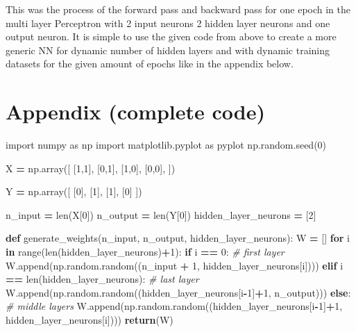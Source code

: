 \documentclass[
]{book}
\newenvironment{Shaded}{\begin{snugshade}}{\end{snugshade}}
\newcommand{\BuiltInTok}[1]{#1}
\newcommand{\CommentTok}[1]{\textcolor[rgb]{0.56,0.35,0.01}{\textit{#1}}}
\newcommand{\ControlFlowTok}[1]{\textcolor[rgb]{0.13,0.29,0.53}{\textbf{#1}}}
\newcommand{\DecValTok}[1]{\textcolor[rgb]{0.00,0.00,0.81}{#1}}
\newcommand{\ImportTok}[1]{#1}
\newcommand{\KeywordTok}[1]{\textcolor[rgb]{0.13,0.29,0.53}{\textbf{#1}}}
\newcommand{\NormalTok}[1]{#1}
\newcommand{\OperatorTok}[1]{\textcolor[rgb]{0.81,0.36,0.00}{\textbf{#1}}}
\begin{document}
This was the process of the forward pass and backward pass for one epoch in the multi layer Perceptron with 2 input neurons 2 hidden layer neurons and one output neuron. It is simple to use the given code from above to create a more generic NN for dynamic number of hidden layers and with dynamic training datasets for the given amount of epochs like in the appendix below.

\hypertarget{appendix-complete-code-2}{%
\section{Appendix (complete code)}\label{appendix-complete-code-2}}

\begin{Shaded}
\begin{Highlighting}[]
\ImportTok{import}\NormalTok{ numpy }\ImportTok{as}\NormalTok{ np}
\ImportTok{import}\NormalTok{ matplotlib.pyplot }\ImportTok{as}\NormalTok{ pyplot}
\NormalTok{np.random.seed(}\DecValTok{0}\NormalTok{)}

\NormalTok{X }\OperatorTok{=}\NormalTok{ np.array([}
\NormalTok{  [}\DecValTok{1}\NormalTok{,}\DecValTok{1}\NormalTok{],}
\NormalTok{  [}\DecValTok{0}\NormalTok{,}\DecValTok{1}\NormalTok{],}
\NormalTok{  [}\DecValTok{1}\NormalTok{,}\DecValTok{0}\NormalTok{],}
\NormalTok{  [}\DecValTok{0}\NormalTok{,}\DecValTok{0}\NormalTok{],}
\NormalTok{])}

\NormalTok{Y }\OperatorTok{=}\NormalTok{ np.array([}
\NormalTok{  [}\DecValTok{0}\NormalTok{],}
\NormalTok{  [}\DecValTok{1}\NormalTok{],}
\NormalTok{  [}\DecValTok{1}\NormalTok{],}
\NormalTok{  [}\DecValTok{0}\NormalTok{]}
\NormalTok{])}

\NormalTok{n\_input }\OperatorTok{=} \BuiltInTok{len}\NormalTok{(X[}\DecValTok{0}\NormalTok{])}
\NormalTok{n\_output }\OperatorTok{=} \BuiltInTok{len}\NormalTok{(Y[}\DecValTok{0}\NormalTok{])}
\NormalTok{hidden\_layer\_neurons }\OperatorTok{=}\NormalTok{ [}\DecValTok{2}\NormalTok{]}


\KeywordTok{def}\NormalTok{ generate\_weights(n\_input, n\_output, hidden\_layer\_neurons):}
\NormalTok{  W }\OperatorTok{=}\NormalTok{ []}
  \ControlFlowTok{for}\NormalTok{ i }\KeywordTok{in} \BuiltInTok{range}\NormalTok{(}\BuiltInTok{len}\NormalTok{(hidden\_layer\_neurons)}\OperatorTok{+}\DecValTok{1}\NormalTok{):}
    \ControlFlowTok{if}\NormalTok{ i }\OperatorTok{==} \DecValTok{0}\NormalTok{: }\CommentTok{\# first layer}
\NormalTok{      W.append(np.random.random((n\_input }\OperatorTok{+} \DecValTok{1}\NormalTok{, hidden\_layer\_neurons[i])))}
    \ControlFlowTok{elif}\NormalTok{ i }\OperatorTok{==} \BuiltInTok{len}\NormalTok{(hidden\_layer\_neurons): }\CommentTok{\# last layer}
\NormalTok{      W.append(np.random.random((hidden\_layer\_neurons[i}\OperatorTok{{-}}\DecValTok{1}\NormalTok{]}\OperatorTok{+}\DecValTok{1}\NormalTok{, n\_output)))}
    \ControlFlowTok{else}\NormalTok{: }\CommentTok{\# middle layers}
\NormalTok{      W.append(np.random.random((hidden\_layer\_neurons[i}\OperatorTok{{-}}\DecValTok{1}\NormalTok{]}\OperatorTok{+}\DecValTok{1}\NormalTok{, hidden\_layer\_neurons[i])))}
  \ControlFlowTok{return}\NormalTok{(W)}


\end{Highlighting}
\end{Shaded}
\end{document}
